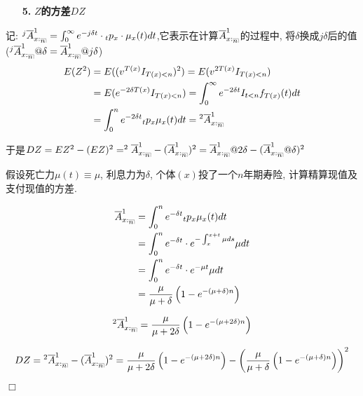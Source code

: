\documentclass[a4paper,10pt]{ctexbook}
\makeatletter
\newcommand{\hei}{\CJKfamily{hei}}      %
\def\qed{\hfill$\Box$\medskip}
\DeclareRobustCommand{\annu}[1]{_{%
    \def\arraystretch{0}%
    \setlength\arraycolsep{1pt}%
    \setlength\arrayrulewidth{.2pt}%
    \begin{array}[b]{@{}c|}\hline
        \\[\arraycolsep]%
        \scriptstyle #1%
    \end{array}%
}}
\makeatother
\begin{document}
\begin{itemize}
    \item[{\bf\hei 5.}]{\bf\hei $Z$的方差$DZ$}
\end{itemize}

记: $^j\overline{A}_{x:\annu{n}}^1=\int_0^{\infty}{e^{-j\delta t}\cdot {}_tp_x\cdot \mu_{x}(t)dt}$,它表示在计算$\overline{A}_{x:\annu{n}}^1$的过程中, 将$\delta$换成$j\delta$后的值($^j\overline{A}_{x:\annu{n}}^1@\delta=\overline{A}_{x:\annu{n}}^1@j\delta$)
\begin{align*}
    E(Z^2) & =E((v^{T(x)}I_{T(x)<n})^2)=E(v^{2T(x)}I_{T(x)<n})                                   \\
           & =E(e^{-2\delta T(x)}I_{T(x)<n})=\int_0^{\infty}{e^{-2\delta t}I_{t<n}f_{T(x)}(t)dt} \\
           & =\int_0^n{e^{-2\delta t}{}_tp_x\mu_x(t)dt}={}^2\overline{A}_{x:\annu{n}}^1
\end{align*}

于是$DZ=EZ^2-(EZ)^2=^2\overline{A}_{x:\annu{n}}^1-(\overline{A}_{x:\annu{n}}^1)^2=\overline{A}_{x:\annu{n}}^1@2\delta-(\overline{A}_{x:\annu{n}}^1@\delta)^2$

\begin{example}
    假设死亡力$\mu(t) \equiv \mu $, 利息力为$\delta$, 个体$(x)$投了一个$n$年期寿险, 计算精算现值及支付现值的方差.
\end{example}

\solution
\begin{align*}
    \overline{A}_{x:\annu{n}}^1 & = \int_0^n{e^{-\delta t}{}_tp_x\mu_x(t)dt}                        \\
                                & = \int_0^n{e^{-\delta t}\cdot e^{-\int_{x}^{x+t} \mu ds}\mu dt}   \\
                                & = \int_0^n{e^{-\delta t}\cdot e^{-\mu t}\mu dt}                   \\
                                & = \frac{\mu}{\mu + \delta} \left(1 - e^{-(\mu + \delta)n} \right)
\end{align*}

\begin{align*}
    ^2\overline{A}_{x:\annu{n}}^1 = \frac{\mu}{\mu + 2\delta} \left(1 - e^{-(\mu + 2\delta)n} \right)
\end{align*}

\begin{align*}
    DZ = {}^2\overline{A}_{x:\annu{n}}^1 - (\overline{A}_{x:\annu{n}}^1)^2 = \frac{\mu}{\mu + 2\delta} \left(1 - e^{-(\mu + 2\delta)n} \right) - \left(\frac{\mu}{\mu + \delta} \left(1 - e^{-(\mu + \delta)n} \right)\right)^2
\end{align*}
\qed
\end{document}
